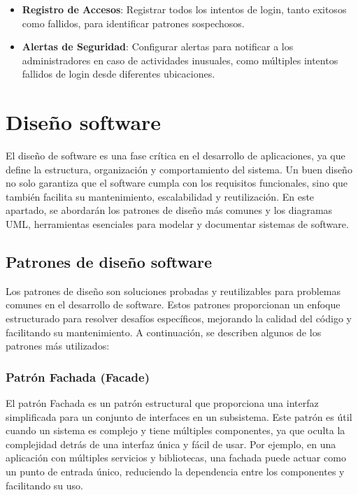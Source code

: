 \documentclass[draft]{scrbook}
\begin{document}
\begin{itemize}
    \item \textbf{Registro de Accesos}: Registrar todos los intentos de login, tanto exitosos como fallidos, para identificar patrones sospechosos.
    \item \textbf{Alertas de Seguridad}: Configurar alertas para notificar a los administradores en caso de actividades inusuales, como múltiples intentos fallidos de login desde diferentes ubicaciones.
\end{itemize}


\section{Diseño software}
El diseño de software es una fase crítica en el desarrollo de aplicaciones, ya que define la estructura, organización y comportamiento del sistema. Un buen diseño no solo garantiza que el software cumpla con los requisitos funcionales, sino que también facilita su mantenimiento, escalabilidad y reutilización. En este apartado, se abordarán los patrones de diseño más comunes y los diagramas UML, herramientas esenciales para modelar y documentar sistemas de software.

\subsection{Patrones de diseño software}
 Los patrones de diseño son soluciones probadas y reutilizables para problemas comunes en el desarrollo de software. Estos patrones proporcionan un enfoque estructurado para resolver desafíos específicos, mejorando la calidad del código y facilitando su mantenimiento. A continuación, se describen algunos de los patrones más utilizados:

\subsubsection{Patrón Fachada (Facade)}
El patrón Fachada es un patrón estructural que proporciona una interfaz simplificada para un conjunto de interfaces en un subsistema. Este patrón es útil cuando un sistema es complejo y tiene múltiples componentes, ya que oculta la complejidad detrás de una interfaz única y fácil de usar. Por ejemplo, en una aplicación con múltiples servicios y bibliotecas, una fachada puede actuar como un punto de entrada único, reduciendo la dependencia entre los componentes y facilitando su uso.
\end{document}
